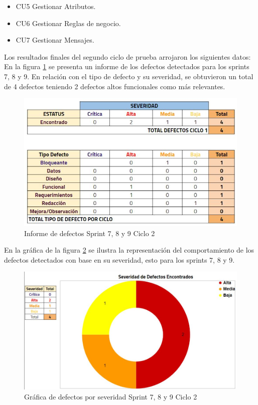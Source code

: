 \begin{itemize}
	\item CU5 Gestionar Atributos.
	\item CU6 Gestionar Reglas de negocio.
	\item CU7 Gestionar Mensajes.
\end{itemize}

Los resultados finales del segundo ciclo de prueba arrojaron los siguientes datos:\\

En la figura \ref{fig:infos7c2} se presenta un informe de los defectos detectados para los sprints 7, 8 y 9. En relación con el tipo de defecto y su severidad, se obtuvieron un total de 4 defectos teniendo 2 defectos altos funcionales como más relevantes.

\begin{figure}[H]
	\begin{center}
		\includegraphics[width=.75\textwidth]{images/pruebas/s7c2}
		\caption{Informe de defectos Sprint 7, 8 y 9  Ciclo 2}
		\label{fig:infos7c2}
	\end{center}
\end{figure}

En la gráfica de la figura \ref{fig:infos7c2-1} se ilustra la representación del comportamiento de los defectos detectados con base en su severidad, esto para los sprints 7, 8 y 9.

\begin{figure}[H]
	\begin{center}
		\includegraphics[width=.75\textwidth]{images/pruebas/s7c2-1}
		\caption{Gráfica de defectos por severidad Sprint 7, 8 y 9  Ciclo 2}
		\label{fig:infos7c2-1}
	\end{center}
\end{figure}

